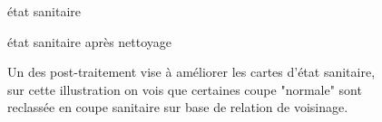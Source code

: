 \documentclass[a4paper, 12pt]{article} %
\begin{document}
\begin{figure}
\begin{minipage}[b]{.49\linewidth}
	\centering état sanitaire
\end{minipage}%
\begin{minipage}[b]{.49\linewidth}
	\centering état sanitaire après nettoyage
\end{minipage}
	\label{fig:clean}
	\caption{Un des post-traitement vise à améliorer les cartes d'état sanitaire, sur cette illustration on vois que certaines coupe "normale" sont reclassée en coupe sanitaire sur base de relation de voisinage.}
\end{figure}
\end{document}
